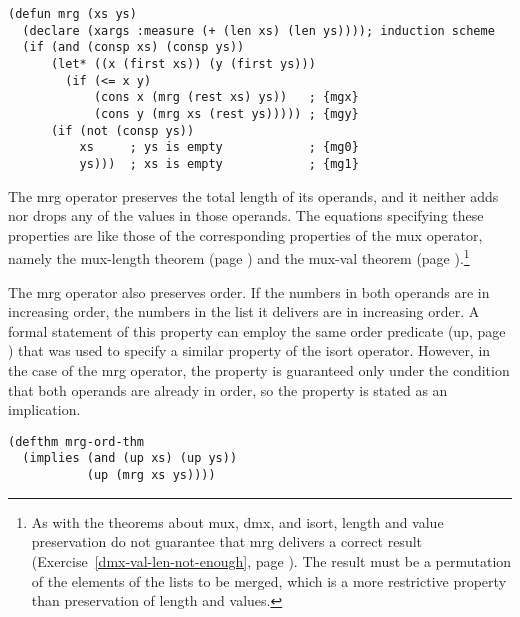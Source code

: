 \label{defun:mrg}\begin{Verbatim}
(defun mrg (xs ys)
  (declare (xargs :measure (+ (len xs) (len ys)))); induction scheme
  (if (and (consp xs) (consp ys))
      (let* ((x (first xs)) (y (first ys)))
        (if (<= x y)
            (cons x (mrg (rest xs) ys))   ; {mgx}
            (cons y (mrg xs (rest ys))))) ; {mgy}
      (if (not (consp ys))
          xs     ; ys is empty            ; {mg0}
          ys)))  ; xs is empty            ; {mg1}
\end{Verbatim}

The \textsf{mrg} operator preserves the total length of its operands,
and it neither adds nor drops any of the values in those operands.
The equations specifying these properties are like those of the
corresponding properties of the \textsf{mux} operator, namely
the mux-length theorem (page \pageref{mux-length-thm}) and the
mux-val theorem (page \pageref{thm:mux-val}).\footnote{As
with the theorems about
\textsf{mux}, \textsf{dmx}, and \textsf{isort}, length and value preservation
do not guarantee that \textsf{mrg} delivers a correct result
(Exercise~\ref{dmx-val-len-not-enough}, page \pageref{dmx-val-len-not-enough}).
The result must be a permutation
of the elements of the lists to be merged,
which is a more restrictive property than
preservation of length and values.}

The \textsf{mrg} operator also preserves order.
If the numbers in both operands are in increasing order,
the numbers in the list it delivers are in increasing order.
A formal statement of this property can employ the same order predicate
(\textsf{up}, page \pageref{defun:up}) that was used to specify a
similar property of the \textsf{isort} operator.
However, in the case of the \textsf{mrg} operator,
the property is guaranteed only under the condition
that both operands are already in order,
so the property is stated as an implication.

\label{defthm:mrg-ord}
\begin{Verbatim}
(defthm mrg-ord-thm
  (implies (and (up xs) (up ys))
           (up (mrg xs ys))))
\end{Verbatim}

